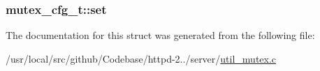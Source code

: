\subsubsection[{\texorpdfstring{set}{set}}]{ mutex\+\_\+cfg\+\_\+t\+::set}\hypertarget{structmutex__cfg__t_ab52c4e56323fd1de3afa6969477e5ef6}{}\label{structmutex__cfg__t_ab52c4e56323fd1de3afa6969477e5ef6}


The documentation for this struct was generated from the following file\+:\begin{DoxyCompactItemize}
\item 
/usr/local/src/github/\+Codebase/httpd-\/2../server/\hyperlink{util__mutex_8c}{util\+\_\+mutex.\+c}\end{DoxyCompactItemize}

